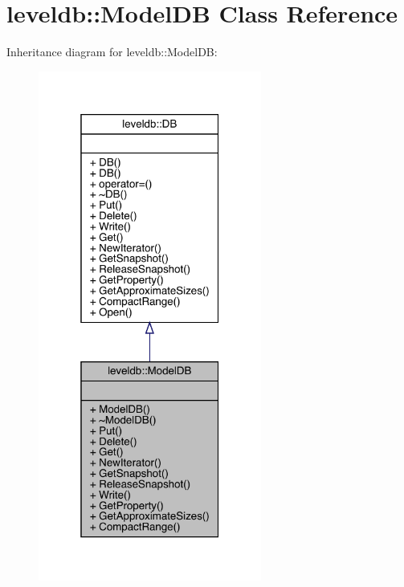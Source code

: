 \hypertarget{classleveldb_1_1_model_d_b}{}\section{leveldb\+::Model\+DB Class Reference}
\label{classleveldb_1_1_model_d_b}


Inheritance diagram for leveldb\+::Model\+DB\+:
\nopagebreak
\begin{figure}[H]
\begin{center}
\leavevmode
\includegraphics[width=208pt]{classleveldb_1_1_model_d_b__inherit__graph}
\end{center}
\end{figure}


